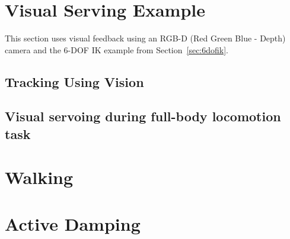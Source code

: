 \section{Visual Serving Example}\label{sec:visuralServoing}
This section uses visual feedback using an RGB-D (Red Green Blue - Depth) camera and the 6-DOF IK example from Section~\ref{sec:6dofik}.
	\subsection{Tracking Using Vision}\label{sec:visTracking}
		
	\subsection{Visual servoing during full-body locomotion task}
		
		
\section{Walking}\label{sec:walking:example}
	

\section{Active Damping}\label{sec:activedamping}
	














